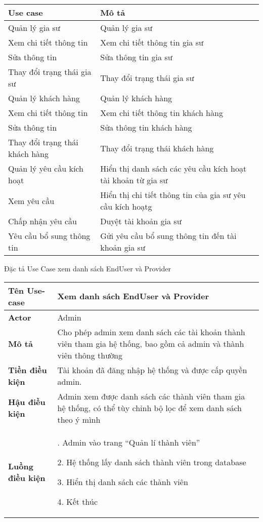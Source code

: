 \documentclass[12pt,a4paper]{report}
\begin{document}
\begin{center}
 \begin{tabular}{|>{\raggedright\arraybackslash}m{4cm}|>{\raggedright\arraybackslash}m{11.5cm}|}
\hline 
\textbf{Use case} & \textbf{Mô tả} \\ 
\hline 
Quản lý gia sư & Quản lý gia sư \\ 
\hline 
Xem chi tiết thông tin  & Xem chi tiết thông tin gia sư\\ 
\hline 
Sửa thông tin & Sửa thông tin gia sư \\ 
\hline
Thay đổi trạng thái gia sư & Thay đổi trạng thái gia sư \\ 
\hline 
Quản lý khách hàng & Quản lý khách hàng \\ 
\hline 
Xem chi tiết thông tin  & Xem chi tiết thông tin khách hàng \\ 
\hline 
Sửa thông tin   & Sửa thông tin khách hàng \\ 
\hline 
Thay đổi trạng thái khách hàng   & Thay đổi trạng thái khách hàng \\ 
\hline
Quản lý yêu cầu kích hoạt   & Hiển thị danh sách các yêu cầu kích hoạt
tài khoản từ gia sư \\ 
\hline 
Xem yêu cầu    & Hiển thị chi tiết thông tin của gia sư yêu
cầu kích hoạtg \\ 
\hline
Chấp nhận yêu cầu   & Duyệt tài khoản gia sư \\ 
\hline
Yêu cầu bổ sung thông tin    & Gửi yêu cầu bổ sung thông tin đến tài
khoản gia sư \\ 
\hline 
\end{tabular}
 \end{center} 

\newpage
 Đặc tả Use Case xem danh sách EndUser và Provider
 
 \begin{center}
 \begin{tabular}{|>{\raggedright\arraybackslash}m{4cm}|>{\raggedright\arraybackslash}m{11.5cm}|}
 \hline 
 \textbf{Tên Use-case} &  Xem danh sách EndUser và Provider \\ 
 \hline 
 \textbf{Actor} & Admin \\ 
 \hline 
\textbf{ Mô tả} & Cho phép admin xem danh sách các tài khoản thành viên tham gia hệ thống, bao gồm cả admin và thành viên thông thường\\ 
 \hline 
 \textbf{Tiền điều kiện} & Tài khoản đã đăng nhập hệ thống và được cấp quyền admin.\\ 
 \hline 
 \textbf{Hậu điều kiện} & Admin xem được danh sách các thành viên tham gia hệ
thống, có thể tùy chỉnh bộ lọc để xem danh sách theo ý mình \\ 
 \hline 
 \textbf{Luồng điều kiện} & 1. Admin vào trang “Quản lí thành viên”
 
				   2. Hệ thống lấy danh sách thành viên trong database

			       3. Hiển thị danh sách các thành viên
			       
			       4. Kết thúc\\ 
 \hline  
 \end{tabular} 
 \end{center}
\end{document}
